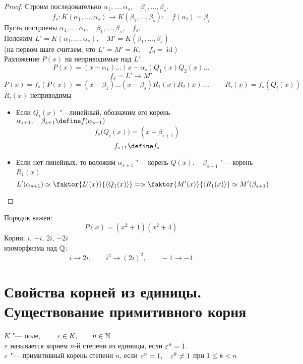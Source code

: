 \begin{proof}
	Строим последовательно $ \alpha_1, \dots, \alpha_s, \quad \beta_1, \dots, \beta_s $.
	$$ f_s : K(\alpha_1, \dots, \alpha_s) \to K(\beta_1, \dots, \beta_s) : \quad f(\alpha_i) = \beta_i $$
	Пусть построены $ \alpha_1, \dots, \alpha_s, \quad \beta_1, \dots, \beta_s, \quad f_s $. \\
	Положим $ L' = K(\alpha_1, \dots, \alpha_s), \quad M' = K(\beta_1, \dots, \beta_s) $ \\
	(на первом шаге считаем, что $ L' = M' = K, \quad f_0 = \operatorname{id} $) \\
	Разложение $ P(x) $ на неприводимые над $ L' $
	$$ P(x) = (x - \alpha_1)\dots(x - \alpha_s) Q_1(x)Q_2(x)\dots $$
	$$ f_s = L' \to M' $$
	$$ P(x) = f_s(P(x)) = (x - \beta_1)\dots(x - \beta_s)R_1(x)R_2(x)\dots, \qquad R_i(x) = f_s(Q_i(x)) $$
	$ R_i(x) $ неприводимы
	\begin{itemize}
		\item Если $ Q_i(x) $ "---линейный, обозначим его корень $ \alpha_{s + 1}, \quad \beta_{s + 1} \define f(\alpha_{s + 1}) $
		$$ f_s \big( Q_i(x) \big) = (x - \beta_{s + 1}) $$
		$$ f_{s + 1} \define f_s $$
		\item Если нет линейных, то воложим $ \alpha_{s + 1} $ "--- корень $ Q(x), \quad \beta_{s + 1} $ "--- корень $ R_1(x) $
		$$ L'(\alpha_{s + 1}) \simeq \faktor{L'(x)}{\braket{Q_1(x)}} = \simeq \faktor{M'(x)}{\braket{R_1(x)}} \simeq M'(\beta_{s + 1}) $$
	\end{itemize}
\end{proof}

\begin{remark}
	Порядок важен:
	$$ P(x) = (x^2 + 1)(x^2 + 4) $$
	Корни: $ i $, $ -i $, $ 2i $, $ -2i $ \\
	 изоморфизма над $ \mathbb{Q} $:
	$$ i \to 2i, \qquad i^2 \to (2i)^2, \qquad -1 \to -4 $$
\end{remark}

\section{Свойства корней из единицы. Существование примитивного корня}

\begin{definition}
	$ K $ "--- поле, $ \qquad \varepsilon \in K, \qquad n \in \mathbb{N} $ \\
	$ \varepsilon $ называется корнем $ n $-й степени из единицы, если $ \varepsilon^n = 1 $. \\
	$ \varepsilon $ "--- примитивный корень степени $ n $, если $ \varepsilon^n = 1, \quad \varepsilon^k \ne 1 $ при $ 1 \le k < n $
\end{definition}

